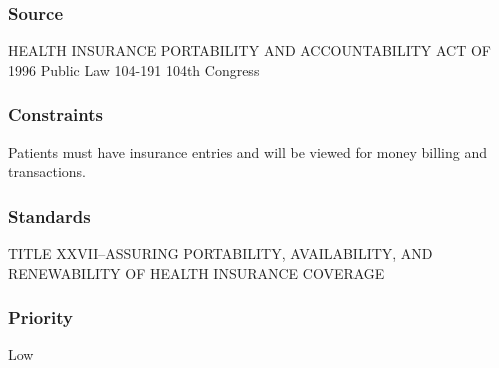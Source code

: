 \subsubsection{Source}
HEALTH INSURANCE PORTABILITY AND ACCOUNTABILITY ACT OF 1996 Public Law 104-191 104th Congress
\subsubsection{Constraints}
Patients must have insurance entries and will be viewed for money billing and transactions.
\subsubsection{Standards}
TITLE XXVII--ASSURING PORTABILITY, AVAILABILITY, AND RENEWABILITY OF HEALTH INSURANCE COVERAGE \cite{Caplan2003}
\subsubsection{Priority}
Low